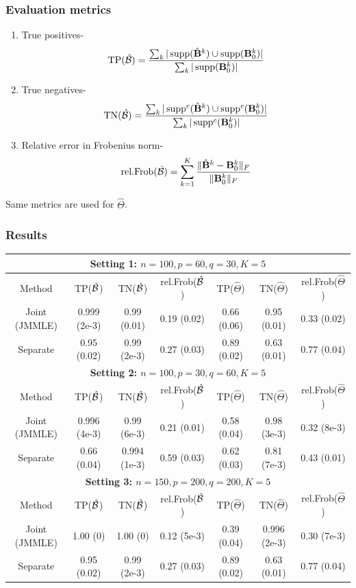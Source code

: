 \documentclass[10pt]{beamer}
\theoremstyle{definition}
\DeclareMathOperator*{\supp}{\text{supp}}
\begin{document}
\begin{frame}
\frametitle{Evaluation metrics}
\begin{enumerate}
\item True positives-
%
\[
\text{TP} (\hat \cB) = \frac{\sum_k | \supp(\hat \bfB^k) \cup \supp (\bfB_0^k)|}{\sum_k | \supp (\bfB_0^k)| }
\]
\item True negatives-
%
\[
\text{TN} (\hat \cB) = \frac{\sum_k | \supp^c(\hat \bfB^k) \cup \supp^c (\bfB_0^k)|}{\sum_k | \supp^c (\bfB_0^k)| }
\]
%
\item Relative error in Frobenius norm-
%
\[
\text{rel.Frob} (\hat {{\cal{B}}}) = \sum_{k=1}^K \frac{\| \hat {{\mathbf{B}}}^k - {\mathbf{B}}_0^k \|_F}{\| {\mathbf{B}}_0^k \|_F}
\]
%
\end{enumerate}

Same metrics are used for $\hat \Theta$.
\end{frame}
\begin{frame}
\frametitle{Results}

\begin{scriptsize}
\begin{table}
    \begin{tabular}{c|ccc|ccc}
    \hline
    \multicolumn{7}{c}{{\bf Setting 1: $n=100, p=60, q=30, K=5$}}\\\hline
    Method        & TP($\hat{{\cal{B}}}$)         & TN($\hat{{\cal{B}}}$)         & rel.Frob($\hat{{\cal{B}}}$) & TP($\hat\Theta$)   & TN($\hat\Theta$)   & rel.Frob($\hat\Theta$) \\\hline
    Joint (JMMLE) & 0.999 (2e-3) & 0.99 (0.01)   & 0.19 (0.02)  & 0.66 (0.06) & 0.95 (0.01) & 0.33 (0.02)      \\
    Separate      & 0.95 (0.02)   & 0.99  (2e-3) & 0.27 (0.03)  & 0.89 (0.02) & 0.63 (0.01) & 0.77 (0.04)      \\\hline
    \multicolumn{7}{c}{{\bf Setting 2: $n=100, p=30, q=60, K=5$}}\\\hline
    Method        & TP($\hat{{\cal{B}}}$)         & TN($\hat{{\cal{B}}}$)         & rel.Frob($\hat{{\cal{B}}}$) & TP($\hat\Theta$)   & TN($\hat\Theta$)   & rel.Frob($\hat\Theta$) \\\hline
    Joint (JMMLE) & 0.996 (4e-3) & 0.99 (6e-3)   & 0.21 (0.01)  & 0.58 (0.04) & 0.98 (3e-3) & 0.32 (8e-3)      \\
    Separate      & 0.66 (0.04)  & 0.994  (1e-3) & 0.59 (0.03)  & 0.62 (0.03) & 0.81 (7e-3) & 0.43 (0.01)      \\\hline
    \multicolumn{7}{c}{{\bf Setting 3: $n=150, p=200, q=200, K=5$}}\\\hline
    Method        & TP($\hat{{\cal{B}}}$)         & TN($\hat{{\cal{B}}}$)         & rel.Frob($\hat{{\cal{B}}}$) & TP($\hat\Theta$)   & TN($\hat\Theta$)   & rel.Frob($\hat\Theta$) \\\hline
    Joint (JMMLE) & 1.00 (0) & 1.00 (0)   & 0.12 (5e-3)  & 0.39 (0.04) & 0.996 (2e-3) & 0.30 (7e-3)      \\
    Separate      & 0.95 (0.02)   & 0.99  (2e-3) & 0.27 (0.03)  & 0.89 (0.02) & 0.63 (0.01) & 0.77 (0.04)      \\\hline
    \end{tabular}
\end{table}
\end{scriptsize}
\end{frame}
\end{document}

